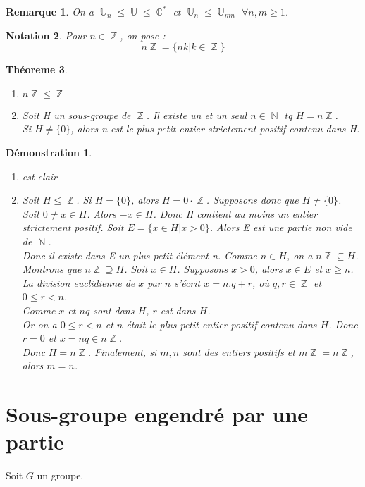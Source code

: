 \documentclass[a4paper, oneside]{report}
\theoremstyle{break}
\newtheorem{thm}{Théoreme}[section] %
\newtheorem{nota}[thm]{Notation}
\newtheorem{remar}[thm]{Remarque}
\newtheorem*{demo}{Démonstration}
\DeclareMathOperator{\N}{\mathbb{N}}
\DeclareMathOperator{\C}{\mathbb{C}}
\DeclareMathOperator{\Z}{\mathbb{Z}}
\DeclareMathOperator{\U}{\mathbb{U}}
\begin{document}
\begin{remar}
	On a $\U_n \leq \U \leq \C^*$ et $\U_n \leq \U_{mn}$ $\forall n,m\geq 1$.\\
\end{remar}

\begin{nota}
	Pour $n\in \Z$, on pose :
	$$n\Z = \{nk| k\in \Z \}$$
\end{nota}

\begin{thm}
	\begin{enumerate}
		\item $n\Z \leq \Z$
		\item Soit H un sous-groupe de $\Z$. Il existe un et un seul $n\in \N$ tq $H=n\Z$.\\
		Si $H\neq \{0\}$, alors n est le plus petit entier strictement positif contenu dans H.
	\end{enumerate}
\end{thm}

\begin{demo}
	\begin{enumerate}
		\item est clair
		\item Soit $H \leq \Z$. Si $H=\{0\}$, alors $H=0\cdot\Z$. Supposons donc que $H\neq \{0\}$.\\
		Soit $0\neq x\in H$. Alors $-x\in H$. Donc H contient au moins un entier strictement positif. Soit $E=\{x\in H | x>0 \}$. Alors E est une partie non vide de $\N$.\\
		Donc il existe dans E un plus petit élément n. Comme $n\in H$, on a $n\Z \subseteq H$.\\
		Montrons que $n\Z \supseteq H$. Soit $x\in H$. Supposons $x>0$, alors $x\in E$ et $x\geq n$.\\
		La division euclidienne de $x$ par $n$ s'écrit $x=n.q+r$, où $q,r\in \Z$ et $0\leq r< n$.\\
		Comme $x$ et $nq$ sont dans $H$, $r$ est dans $H$.\\
		Or on a $0\leq r<n$ et $n$ était le plus petit entier positif contenu dans $H$. Donc $r=0$ et $x=nq \in n\Z$.\\
		Donc $H=n\Z$. Finalement, si $m,n$ sont des entiers positifs et $m\Z=n\Z$, alors $m=n$.
	\end{enumerate}
\end{demo}

\section{Sous-groupe engendré par une partie}
Soit $G$ un groupe.
\end{document}

